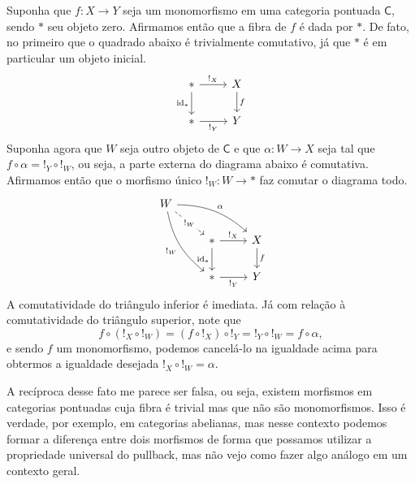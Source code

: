 \begin{exem}
  Suponha que $f: X \to Y$ seja um monomorfismo em uma categoria pontuada $\mathsf{C}$, sendo $*$ seu objeto zero.
  Afirmamos então que a fibra de $f$ é dada por $*$.
  De fato, no primeiro que o quadrado abaixo é trivialmente comutativo, já que $*$ é em particular um objeto inicial.
  \begin{displaymath}
    \begin{tikzcd}
      *
      \arrow[r, "!_{X}"]
      \arrow[d, "\id_{*}" swap]
      & X
      \arrow[d, "f"]
      \\ *
      \arrow[r, "!_{Y}" swap]
      & Y
    \end{tikzcd}
  \end{displaymath}
  Suponha agora que $W$ seja outro objeto de $\mathsf{C}$ e que $\alpha: W \to X$ seja tal que $f \circ \alpha = !_{Y} \circ !_{W}$, ou seja, a parte externa do diagrama abaixo é comutativa.
  Afirmamos então que o morfismo único $!_{W}: W \to *$ faz comutar o diagrama todo.
  \begin{displaymath}
    \begin{tikzcd}
      W
      \arrow[rrd, bend left=20, "\alpha"]
      \arrow[rdd, bend right=20, "!_{W}" swap]
      \arrow[rd, dashed, "!_{W}" description]
      \\ & *
      \arrow[r, "!_{X}"]
      \arrow[d, "\id_{*}" swap]
      & X
      \arrow[d, "f"]
      \\ & *
      \arrow[r, "!_{Y}" swap]
      & Y
    \end{tikzcd}
  \end{displaymath}
  A comutatividade do triângulo inferior é imediata.
  Já com relação à comutatividade do triângulo superior, note que
  \begin{displaymath}
    f \circ (!_{X} \circ !_{W}) = (f \circ !_{X}) \circ !_{Y} = !_{Y} \circ !_{W} = f \circ \alpha,
  \end{displaymath}
  e sendo $f$ um monomorfismo, podemos cancelá-lo na igualdade acima para obtermos a igualdade desejada $!_{X} \circ !_{W} = \alpha$.

  A recíproca desse fato me parece ser falsa, ou seja, existem morfismos em categorias pontuadas cuja fibra é trivial mas que não são monomorfismos.
  Isso é verdade, por exemplo, em categorias abelianas, mas nesse contexto podemos formar a diferença entre dois morfismos de forma que possamos utilizar a propriedade universal do pullback, mas não vejo como fazer algo análogo em um contexto geral.
\end{exem}

